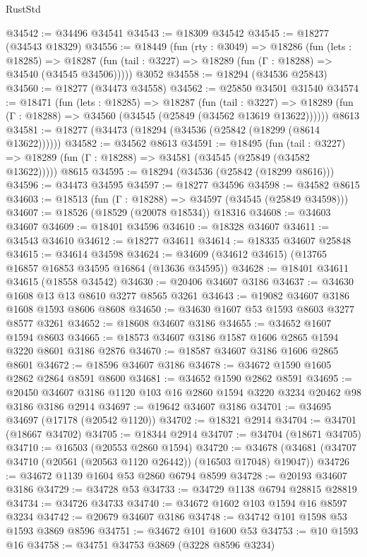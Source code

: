\begin{lexlean}{RustStd}
\begin{coremodule}
@34542 := @34496 @34541
@34543 := @18309 @34542
@34545 := @18277 (@34543 @18329)
@34556 := @18449
    (fun (rty : @3049) =>
    @18286
      (fun (lets : @18285) =>
      @18287 (fun (tail : @3227) => @18289 (fun (Γ : @18288) => @34540 (@34545 @34506)))))
    @3052
@34558 := @18294 (@34536 @25843)
@34560 := @18277 (@34473 @34558)
@34562 := @25850 @34501 @31540
@34574 := @18471
    (fun (lets : @18285) =>
    @18287
      (fun (tail : @3227) =>
      @18289 (fun (Γ : @18288) => @34560 (@34545 (@25849 (@34562 @13619 @13622))))))
    @8613
@34581 := @18277 (@34473 (@18294 (@34536 (@25842 (@18299 (@8614 @13622))))))
@34582 := @34562 @8613
@34591 := @18495
    (fun (tail : @3227) => @18289 (fun (Γ : @18288) => @34581 (@34545 (@25849 (@34582 @13622)))))
    @8615
@34595 := @18294 (@34536 (@25842 (@18299 @8616)))
@34596 := @34473 @34595
@34597 := @18277 @34596
@34598 := @34582 @8615
@34603 := @18513 (fun (Γ : @18288) => @34597 (@34545 (@25849 @34598)))
@34607 := @18526 (@18529 (@20078 @18534)) @18316
@34608 := @34603 @34607
@34609 := @18401 @34596
@34610 := @18328 @34607
@34611 := @34543 @34610
@34612 := @18277 @34611
@34614 := @18335 @34607 @25848
@34615 := @34614 @34598
@34624 := @34609 (@34612 @34615) (@13765 @16857 @16853 @34595 @16864 (@13636 @34595))
@34628 := @18401 @34611 @34615 (@18558 @34542)
@34630 := @20406 @34607 @3186
@34637 := @34630 @1608 @13 @13 @8610 @3277 @8565 @3261
@34643 := @19082 @34607 @3186 @1608 @1593 @8606 @8608
@34650 := @34630 @1607 @53 @1593 @8603 @3277 @8577 @3261
@34652 := @18608 @34607 @3186
@34655 := @34652 @1607 @1594 @8603
@34665 := @18573 @34607 @3186 @1587 @1606 @2865 @1594 @3220 @8601 @3186 @2876
@34670 := @18587 @34607 @3186 @1606 @2865 @8601
@34672 := @18596 @34607 @3186
@34678 := @34672 @1590 @1605 @2862 @2864 @8591 @8600
@34681 := @34652 @1590 @2862 @8591
@34695 := @20450 @34607 @3186 @1120 @103 @16 @2860 @1594 @3220 @3234 @20462 @98 @3186 @3186 @2914
@34697 := @19642 @34607 @3186
@34701 := @34695 @34697 (@17178 (@20542 @1120))
@34702 := @18321 @2914
@34704 := @34701 (@18667 @34702)
@34705 := @18344 @2914
@34707 := @34704 (@18671 @34705)
@34710 := @16503 (@20553 @2860 @1594)
@34720 := @34678 (@34681 (@34707 @34710 (@20561 (@20563 @1120 @26442)) (@16503 @17048) @19047))
@34726 := @34672 @1139 @1604 @53 @2860 @6794 @8599
@34728 := @20193 @34607 @3186
@34729 := @34728 @53
@34733 := @34729 @1138 @6794 @28815 @28819
@34734 := @34726 @34733
@34740 := @34672 @1602 @103 @1594 @16 @8597 @3234
@34742 := @20679 @34607 @3186
@34748 := @34742 @101 @1598 @53 @1593 @3869 @8596
@34751 := @34672 @101 @1600 @53
@34753 := @10 @1593 @16
@34758 := @34751 @34753 @3869 (@3228 @8596 @3234)

\end{coremodule}
\end{lexlean}
